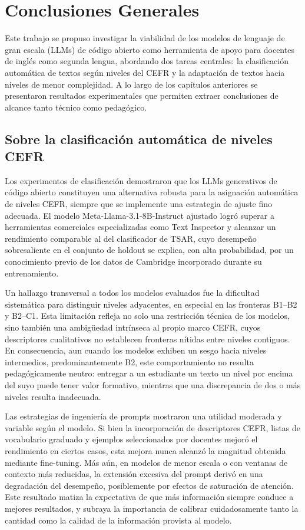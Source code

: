 \section{Conclusiones Generales}

Este trabajo se propuso investigar la viabilidad de los modelos de lenguaje de gran escala (LLMs) de código abierto como herramienta de apoyo para docentes de inglés como segunda lengua, abordando dos tareas centrales: la clasificación automática de textos según niveles del CEFR y la adaptación de textos hacia niveles de menor complejidad. A lo largo de los capítulos anteriores se presentaron resultados experimentales que permiten extraer conclusiones de alcance tanto técnico como pedagógico.

\subsection*{Sobre la clasificación automática de niveles CEFR}

Los experimentos de clasificación demostraron que los LLMs generativos de código abierto constituyen una alternativa robusta para la asignación automática de niveles CEFR, siempre que se implemente una estrategia de ajuste fino adecuada. El modelo Meta-Llama-3.1-8B-Instruct ajustado logró superar a herramientas comerciales especializadas como Text Inspector y alcanzar un rendimiento comparable al del clasificador de TSAR, cuyo desempeño sobresaliente en el conjunto de holdout se explica, con alta probabilidad, por un conocimiento previo de los datos de Cambridge incorporado durante su entrenamiento.

Un hallazgo transversal a todos los modelos evaluados fue la dificultad sistemática para distinguir niveles adyacentes, en especial en las fronteras B1--B2 y B2--C1. Esta limitación refleja no solo una restricción técnica de los modelos, sino también una ambigüedad intrínseca al propio marco CEFR, cuyos descriptores cualitativos no establecen fronteras nítidas entre niveles contiguos. En consecuencia, aun cuando los modelos exhiben un sesgo hacia niveles intermedios, predominantemente B2, este comportamiento no resulta pedagógicamente neutro: entregar a un estudiante un texto un nivel por encima del suyo puede tener valor formativo, mientras que una discrepancia de dos o más niveles resulta inadecuada.

Las estrategias de ingeniería de prompts mostraron una utilidad moderada y variable según el modelo. Si bien la incorporación de descriptores CEFR, listas de vocabulario graduado y ejemplos seleccionados por docentes mejoró el rendimiento en ciertos casos, esta mejora nunca alcanzó la magnitud obtenida mediante fine-tuning. Más aún, en modelos de menor escala o con ventanas de contexto más reducidas, la extensión excesiva del prompt derivó en una degradación del desempeño, posiblemente por efectos de saturación de atención. Este resultado matiza la expectativa de que más información siempre conduce a mejores resultados, y subraya la importancia de calibrar cuidadosamente tanto la cantidad como la calidad de la información provista al modelo.

